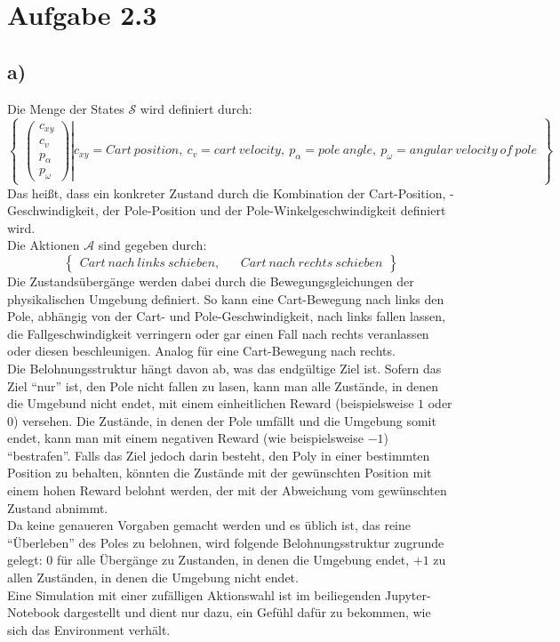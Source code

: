 \documentclass[11pt]{article}
\begin{document}
\section*{Aufgabe 2.3}
\subsection*{a)}
Die Menge der States $\mathcal{S}$ wird definiert durch:
\[ %
\begin{Bmatrix}
    \left.
    \begin{pmatrix}
        c_{xy}\\
        c_v\\
        p_\alpha\\
        p_\omega
    \end{pmatrix}
    \right\vert
    c_{xy} = Cart~position,~c_v = cart~velocity,~p_\alpha = pole~angle,~p_\omega = angular~velocity~of~pole
\end{Bmatrix}
\]%
Das heißt, dass ein konkreter Zustand durch die Kombination der Cart-Position, -Geschwindigkeit, der Pole-Position und der Pole-Winkelgeschwindigkeit definiert wird.\\
Die Aktionen $\mathcal{A}$ sind gegeben durch:
\[ %
\begin{Bmatrix}
    Cart~nach~links~schieben, && Cart~nach~rechts~schieben
\end{Bmatrix}
\]%
Die Zustandsübergänge werden dabei durch die Bewegungsgleichungen der physikalischen Umgebung definiert. So kann eine Cart-Bewegung nach links den Pole, abhängig von der Cart- und Pole-Geschwindigkeit, nach links fallen lassen, die Fallgeschwindigkeit verringern oder gar einen Fall nach rechts veranlassen oder diesen beschleunigen. Analog für eine Cart-Bewegung nach rechts.\\
Die Belohnungsstruktur hängt davon ab, was das endgültige Ziel ist. Sofern das Ziel ``nur'' ist, den Pole nicht fallen zu lasen, kann man alle Zustände, in denen die Umgebund nicht endet, mit einem einheitlichen Reward (beispielsweise $1$ oder $0$) versehen. Die Zustände, in denen der Pole umfällt und die Umgebung somit endet, kann man mit einem negativen Reward (wie beispielsweise $-1$) ``bestrafen''. Falls das Ziel jedoch darin besteht, den Poly in einer bestimmten Position zu behalten, könnten die Zustände mit der gewünschten Position mit einem hohen Reward belohnt werden, der mit der Abweichung vom gewünschten Zustand abnimmt.\\
Da keine genaueren Vorgaben gemacht werden und es üblich ist, das reine ``Überleben'' des Poles zu belohnen, wird folgende Belohnungsstruktur zugrunde gelegt: $0$ für alle Übergänge zu Zustanden, in denen die Umgebung endet, $+1$ zu allen Zuständen, in denen die Umgebung nicht endet. \\
Eine Simulation mit einer zufälligen Aktionswahl ist im beiliegenden Jupyter-Notebook dargestellt und dient nur dazu, ein Gefühl dafür zu bekommen, wie sich das Environment verhält.
\end{document}

